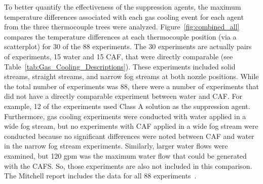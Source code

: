 \documentclass[12pt,oneside]{book}
\begin{document}
To better quantify the effectiveness of the suppression agents, the maximum temperature differences associated with each gas cooling event for each agent from the three thermocouple trees were analyzed. Figure~\ref{fig:combined_all} compares the temperature differences at each thermocouple position (via a scatterplot) for 30 of the 88 experiments. The 30 experiments are actually pairs of experiments, 15 water and 15 CAF, that were directly comparable (see Table~\ref{tab:Gas_Cooling_Descriptions}). These experiments included solid streams, straight streams, and narrow fog streams at both nozzle positions. While the total number of experiments was 88, there were a number of experiments that did not have a directly comparable experiment between water and CAF. For example, 12 of the experiments used Class A solution as the suppression agent. Furthermore, gas cooling experiments were conducted with water applied in a wide fog stream, but no experiments with CAF applied in a wide fog stream were conducted because no significant differences were noted between CAF and water in the narrow fog stream experiments. Similarly, larger water flows were examined, but 120 gpm was the maximum water flow that could be generated with the CAFS. So, those experiments are also not included in this comparison. The Mitchell report includes the data for all 88 experiments~\cite{Mitchell:1}. 
   
\end{document}
